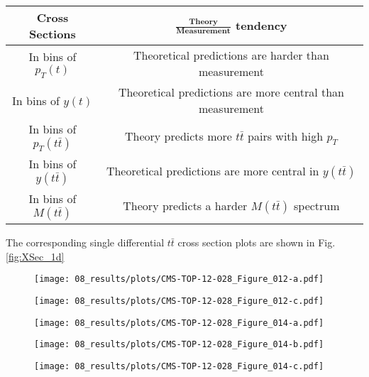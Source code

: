 \begin{center}
 \begin{tabular}{| c | c |}
  \hline
  \textbf{Cross Sections} 		& \textbf{$\frac{\mathbf{\text{Theory}}}{\mathbf{\text{Measurement}}}$ tendency} \\ \hline\hline
  
  In bins of $p_{T}(t)$			& Theoretical predictions are harder than measurement \\ \hline 
  In bins of $y(t)$			& Theoretical predictions are more central than measurement \\ \hline 
  In bins of $p_{T}(t\bar{t})$		& Theory predicts more $t\bar{t}$ pairs with high $p_{T}$ \\ \hline 
  In bins of $y(t\bar{t})$		& Theoretical predictions are more central in $y(t\bar{t})$ \\ \hline
  In bins of $M(t\bar{t})$		& Theory predicts a harder $M(t\bar{t})$ spectrum \\ \hline
 \end{tabular}
\end{center}

The corresponding single differential $t\bar{t}$ cross section plots are shown in Fig. \ref{fig:XSec_1d}

\begin{sidewaysfigure}[p]
\centering
\begin{subfigure}
  \centering
  \texttt{[image: 08\_results/plots/CMS-TOP-12-028\_Figure\_012-a.pdf]}
\end{subfigure}
\begin{subfigure}
  \centering
  \texttt{[image: 08\_results/plots/CMS-TOP-12-028\_Figure\_012-c.pdf]}
\end{subfigure}
\begin{subfigure}
  \centering
  \texttt{[image: 08\_results/plots/CMS-TOP-12-028\_Figure\_014-a.pdf]}
\end{subfigure}
\begin{subfigure}
  \centering
  \texttt{[image: 08\_results/plots/CMS-TOP-12-028\_Figure\_014-b.pdf]}
\end{subfigure}
\begin{subfigure}
  \centering
  \texttt{[image: 08\_results/plots/CMS-TOP-12-028\_Figure\_014-c.pdf]}
\end{subfigure}
\caption{Normalized differential $t\bar{t}$ production cross section in the dilepton channels as a function of the $p_{T}(t)$ (upper left), $y(t)$ (upper middle), 
         $p_{T}(t\bar{t})$ (upper right), $y(t\bar{t})$ (lower left) and $M(t\bar{t})$ (lower right). The data points are placed at the midpoint of the bins. The 
         inner (outer) error bars indicate the statistical (combined statistical and systematic) uncertainties. The measurements are compared to predictions from 
         $\MG+\PYTHIA$, $\Powheg+\PYTHIA$, $\Powheg+\HERWIG$ and $\MCNLO+\HERWIG$, and to NLO+NNLL \cite{Ferroglia:2013zwa, Li:2013mia} calculations, when available. 
         The lower part of each plot shows the ratio of the predictions to data. Plots are taken from \cite{Khachatryan:2015oqa}.}
\label{fig:XSec_1d}
\end{sidewaysfigure}

